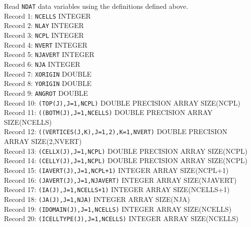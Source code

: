 \vspace{5mm}
\noindent Read \texttt{NDAT} data variables using the definitions defined above. \\
\noindent Record 1: \texttt{NCELLS} {\color{red} \footnotesize{INTEGER}} \\
\noindent Record 2: \texttt{NLAY} {\color{red} \footnotesize{INTEGER}} \\
\noindent Record 3: \texttt{NCPL} {\color{red} \footnotesize{INTEGER}} \\
\noindent Record 4: \texttt{NVERT} {\color{red} \footnotesize{INTEGER}} \\
\noindent Record 5: \texttt{NJAVERT} {\color{red} \footnotesize{INTEGER}} \\
\noindent Record 6: \texttt{NJA} {\color{red} \footnotesize{INTEGER}} \\
\noindent Record 7: \texttt{XORIGIN} {\color{red} \footnotesize{DOUBLE}} \\
\noindent Record 8: \texttt{YORIGIN} {\color{red} \footnotesize{DOUBLE}} \\
\noindent Record 9: \texttt{ANGROT} {\color{red} \footnotesize{DOUBLE}} \\
\noindent Record 10: \texttt{(TOP(J),J=1,NCPL)} {\color{red} \footnotesize{DOUBLE PRECISION ARRAY SIZE(NCPL)}} \\
\noindent Record 11: \texttt{((BOTM(J),J=1,NCELLS)} {\color{red} \footnotesize{DOUBLE PRECISION ARRAY SIZE(NCELLS)}} \\
\noindent Record 12: \texttt{((VERTICES(J,K),J=1,2),K=1,NVERT)} {\color{red} \footnotesize{DOUBLE PRECISION ARRAY SIZE(2,NVERT)}} \\
\noindent Record 13: \texttt{(CELLX(J),J=1,NCPL)} {\color{red} \footnotesize{DOUBLE PRECISION ARRAY SIZE(NCPL)}}\\
\noindent Record 14: \texttt{(CELLY(J),J=1,NCPL)} {\color{red} \footnotesize{DOUBLE PRECISION ARRAY SIZE(NCPL)}} \\
\noindent Record 15: \texttt{(IAVERT(J),J=1,NCPL+1)} {\color{red} \footnotesize{INTEGER ARRAY SIZE(NCPL+1)}} \\
\noindent Record 16: \texttt{(JAVERT(J),J=1,NJAVERT)} {\color{red} \footnotesize{INTEGER ARRAY SIZE(NJAVERT)}} \\
\noindent Record 17: \texttt{(IA(J),J=1,NCELLS+1)} {\color{red} \footnotesize{INTEGER ARRAY SIZE(NCELLS+1)}} \\
\noindent Record 18: \texttt{(JA(J),J=1,NJA)} {\color{red} \footnotesize{INTEGER ARRAY SIZE(NJA)}} \\
\noindent Record 19: \texttt{(IDOMAIN(J),J=1,NCELLS)} {\color{red} \footnotesize{INTEGER ARRAY SIZE(NCELLS)}} \\
\noindent Record 20: \texttt{(ICELLTYPE(J),J=1,NCELLS)} {\color{red} \footnotesize{INTEGER ARRAY SIZE(NCELLS)}} \\

